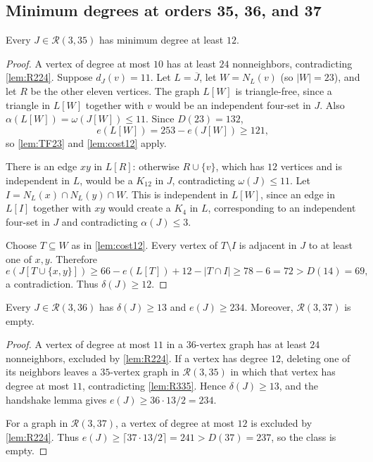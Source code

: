 \subsection{Minimum degrees at orders 35, 36, and 37}

\begin{lemma}
\label{lem:R335}
Every $J\in\mathcal R(3,35)$ has minimum degree at least $12$.
\end{lemma}

\begin{proof}
A vertex of degree at most $10$ has at least $24$ nonneighbors, contradicting \cref{lem:R224}. Suppose $d_J(v)=11$. Let $L=\overline J$, let $W=N_L(v)$ (so $|W|=23$), and let $R$ be the other eleven vertices. The graph $L[W]$ is triangle-free, since a triangle in $L[W]$ together with $v$ would be an independent four-set in $J$. Also $\alpha(L[W])=\omega(J[W])\leq11$. Since $D(23)=132$,
\[
e(L[W])=253-e(J[W])\geq121,
\]
so \cref{lem:TF23} and \cref{lem:cost12} apply.

There is an edge $xy$ in $L[R]$: otherwise $R\cup\{v\}$, which has $12$ vertices and is independent in $L$, would be a $K_{12}$ in $J$, contradicting $\omega(J)\leq11$. Let $I=N_L(x)\cap N_L(y)\cap W$. This is independent in $L[W]$, since an edge in $L[I]$ together with $xy$ would create a $K_4$ in $L$, corresponding to an independent four-set in $J$ and contradicting $\alpha(J)\leq3$.

Choose $T\subseteq W$ as in \cref{lem:cost12}. Every vertex of $T\setminus I$ is adjacent in $J$ to at least one of $x,y$. Therefore
\[
e(J[T\cup\{x,y\}])
\geq 66-e(L[T])+12-|T\cap I|
\geq78-6=72>D(14)=69,
\]
a contradiction. Thus $\delta(J)\geq12$.
\end{proof}

\begin{lemma}
\label{lem:R336}
Every $J\in\mathcal R(3,36)$ has $\delta(J)\geq13$ and $e(J)\geq234$. Moreover, $\mathcal R(3,37)$ is empty.
\end{lemma}

\begin{proof}
A vertex of degree at most $11$ in a $36$-vertex graph has at least $24$ nonneighbors, excluded by \cref{lem:R224}. If a vertex has degree $12$, deleting one of its neighbors leaves a $35$-vertex graph in $\mathcal R(3,35)$ in which that vertex has degree at most $11$, contradicting \cref{lem:R335}. Hence $\delta(J)\geq13$, and the handshake lemma gives $e(J)\geq36\cdot13/2=234$.

For a graph in $\mathcal R(3,37)$, a vertex of degree at most $12$ is excluded by \cref{lem:R224}. Thus $e(J)\geq\lceil37\cdot13/2\rceil=241>D(37)=237$, so the class is empty.
\end{proof}

